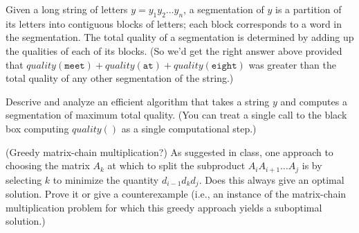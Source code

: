 \begin{questions}
  Given a long string of letters $y = y_1y_2\ldots y_n$, a
  segmentation of $y$ is a partition of its letters into contiguous
  blocks of letters; each block corresponds to a word in the
  segmentation. The total quality of a segmentation is determined by
  adding up the qualities of each of its blocks. (So we’d get the
  right answer above provided that
  $quality(\texttt{meet}) + quality(\texttt{at}) +
  quality(\texttt{eight})$ was greater than the total quality of any
  other segmentation of the string.)

  Descrive and analyze an efficient algorithm that takes a string $y$
  and computes a segmentation of maximum total quality. (You can treat
  a single call to the black box computing $quality()$ as a single
  computational step.)
  \newpage

  \bonusquestion[10] (Greedy matrix-chain multiplication?) As
  suggested in class, one approach to choosing the matrix $A_k$ at
  which to split the subproduct $A_iA_{i+1}\ldots A_j$ is by selecting
  $k$ to minimize the quantity $d_{i-1}d_kd_j$. Does this always give
  an optimal solution. Prove it or give a counterexample (i.e., an
  instance of the matrix-chain multiplication problem for which this
  greedy approach yields a suboptimal solution.)

\end{questions}

